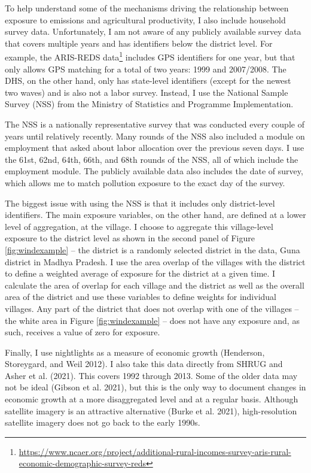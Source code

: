 \documentclass[
]{article}
\begin{document}
To help understand some of the mechanisms driving the relationship between exposure to emissions and agricultural productivity, I also include household survey data. Unfortunately, I am not aware of any publicly available survey data that covers multiple years and has identifiers below the district level. For example, the ARIS-REDS data\footnote{\url{https://www.ncaer.org/project/additional-rural-incomes-survey-aris-rural-economic-demographic-survey-reds}} includes GPS identifiers for one year, but that only allows GPS matching for a total of two years: 1999 and 2007/2008. The DHS, on the other hand, only has state-level identifiers (except for the newest two waves) and is also not a labor survey. Instead, I use the National Sample Survey (NSS) from the Ministry of Statistics and Programme Implementation.

The NSS is a nationally representative survey that was conducted every couple of years until relatively recently. Many rounds of the NSS also included a module on employment that asked about labor allocation over the previous seven days. I use the 61st, 62nd, 64th, 66th, and 68th rounds of the NSS, all of which include the employment module. The publicly available data also includes the date of survey, which allows me to match pollution exposure to the exact day of the survey.

The biggest issue with using the NSS is that it includes only district-level identifiers. The main exposure variables, on the other hand, are defined at a lower level of aggregation, at the village. I choose to aggregate this village-level exposure to the district level as shown in the second panel of Figure \ref{fig:windexample} -- the district is a randomly selected district in the data, Guna district in Madhya Pradesh. I use the area overlap of the villages with the district to define a weighted average of exposure for the district at a given time. I calculate the area of overlap for each village and the district as well as the overall area of the district and use these variables to define weights for individual villages. Any part of the district that does not overlap with one of the villages -- the white area in Figure \ref{fig:windexample} -- does not have any exposure and, as such, receives a value of zero for exposure.

Finally, I use nightlights as a measure of economic growth (Henderson, Storeygard, and Weil 2012). I also take this data directly from SHRUG and Asher et al. (2021). This covers 1992 through 2013. Some of the older data may not be ideal (Gibson et al. 2021), but this is the only way to document changes in economic growth at a more disaggregated level and at a regular basis. Although satellite imagery is an attractive alternative (Burke et al. 2021), high-resolution satellite imagery does not go back to the early 1990s.
\end{document}
